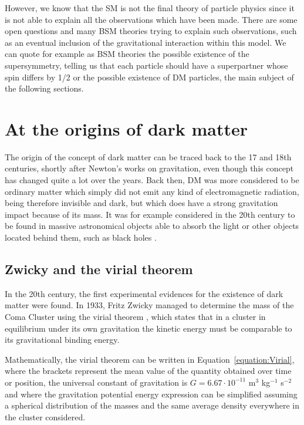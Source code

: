 \documentclass[a4paper, 10pt, openright]{report}
\begin{document}
However, we know that the \ac{SM} is not the final theory of particle physics since it is not able to explain all the observations which have been made. There are some open questions and many \ac{BSM} theories trying to explain such observations, such as an eventual inclusion of the gravitational interaction within this model. We can quote for example as \ac{BSM} theories the possible existence of the supersymmetry, telling us that each particle should have a superpartner whose spin differs by 1/2 or the possible existence of \ac{DM} particles, the main subject of the following sections.

\section{At the origins of dark matter} \label{section:DMOrigins}

The origin of the concept of dark matter can be traced back to the 17 and 18th centuries, shortly after Newton's works on gravitation, even though this concept has changed quite a lot over the years. Back then, \ac{DM} was more considered to be ordinary matter which simply did not emit any kind of electromagnetic radiation, being therefore invisible and dark, but which does have a strong gravitation impact because of its mass. It was for example considered in the 20th century to be found in massive astronomical objects able to absorb the light or other objects located behind them, such as black holes \cite{Poincare}.

\subsection{Zwicky and the virial theorem}

In the 20th century, the first experimental evidences for the existence of dark matter were found. In 1933, Fritz Zwicky managed to determine the mass of the Coma Cluster using the virial theorem \cite{Zwicky}, which states that in a cluster in equilibrium under its own gravitation the kinetic energy must be comparable to its gravitational binding energy. 

Mathematically, the virial theorem can be written in Equation~\ref{equation:Virial}, where the brackets represent the mean value of the quantity obtained over time or position, the universal constant of gravitation is $G = 6.67 \cdot 10^{-11}$ m$^3$ kg$^{-1}$ s$^{-2}$ and where the gravitation potential energy expression can be simplified assuming a spherical distribution of the masses and the same average density everywhere in the cluster considered.
\end{document}
